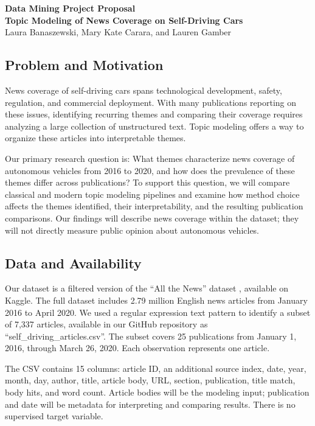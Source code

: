 \documentclass{article}
\begin{document}
\begin{center}
    {\Large\bfseries Data Mining Project Proposal}\\[6pt]
    {\large \bfseries Topic Modeling of News Coverage on Self-Driving Cars} \\[6pt]
    { \large Laura Banaszewski, Mary Kate Carara, and Lauren Gamber}\\[2pt]
\end{center}


\subsection*{Problem and Motivation}
News coverage of self-driving cars spans technological development, safety, regulation, and commercial deployment. With many publications reporting on these issues, identifying recurring themes and comparing their coverage requires analyzing a large collection of unstructured text. Topic modeling offers a way to organize these articles into interpretable themes.

Our primary research question is: What themes characterize news coverage of autonomous vehicles from 2016 to 2020, and how does the prevalence of these themes differ across publications? To support this question, we will compare classical and modern topic modeling pipelines and examine how method choice affects the themes identified, their interpretability, and the resulting publication comparisons. Our findings will describe news coverage within the dataset; they will not directly measure public opinion about autonomous vehicles.


\subsection*{Data and Availability}
Our dataset is a filtered version of the ``All the News'' dataset \parencite{mckinley2021}, available on Kaggle. The full dataset includes 2.79 million English news articles from January 2016 to April 2020. We used a regular expression text pattern to identify a subset of 7,337 articles, available in our GitHub repository as ``self\_driving\_articles.csv''. The subset covers 25 publications from January 1, 2016, through March 26, 2020. Each observation represents one article.

The CSV contains 15 columns: article ID, an additional source index, date, year, month, day, author, title, article body, URL, section, publication, title match, body hits, and word count. Article bodies will be the modeling input; publication and date will be metadata for interpreting and comparing results. There is no supervised target variable.
\end{document}
